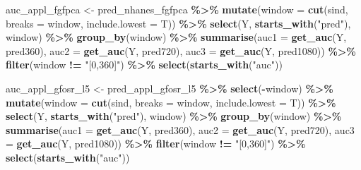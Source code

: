 \documentclass[
]{article}
\newenvironment{Shaded}{\begin{snugshade}}{\end{snugshade}}
\newcommand{\AttributeTok}[1]{\textcolor[rgb]{0.13,0.29,0.53}{#1}}
\newcommand{\FunctionTok}[1]{\textcolor[rgb]{0.13,0.29,0.53}{\textbf{#1}}}
\newcommand{\NormalTok}[1]{#1}
\newcommand{\OtherTok}[1]{\textcolor[rgb]{0.56,0.35,0.01}{#1}}
\newcommand{\SpecialCharTok}[1]{\textcolor[rgb]{0.81,0.36,0.00}{\textbf{#1}}}
\newcommand{\StringTok}[1]{\textcolor[rgb]{0.31,0.60,0.02}{#1}}
\begin{document}
\begin{Shaded}
\begin{Highlighting}[]
\NormalTok{auc\_appl\_fgfpca }\OtherTok{\textless{}{-}}\NormalTok{ pred\_nhanes\_fgfpca }\SpecialCharTok{\%\textgreater{}\%} 
    \FunctionTok{mutate}\NormalTok{(}\AttributeTok{window =} \FunctionTok{cut}\NormalTok{(sind, }\AttributeTok{breaks =}\NormalTok{ window, }\AttributeTok{include.lowest =}\NormalTok{ T)) }\SpecialCharTok{\%\textgreater{}\%} 
    \FunctionTok{select}\NormalTok{(Y, }\FunctionTok{starts\_with}\NormalTok{(}\StringTok{"pred"}\NormalTok{), window) }\SpecialCharTok{\%\textgreater{}\%}
    \FunctionTok{group\_by}\NormalTok{(window) }\SpecialCharTok{\%\textgreater{}\%}
    \FunctionTok{summarise}\NormalTok{(}\AttributeTok{auc1 =} \FunctionTok{get\_auc}\NormalTok{(Y, pred360),}
              \AttributeTok{auc2 =} \FunctionTok{get\_auc}\NormalTok{(Y, pred720),}
              \AttributeTok{auc3 =} \FunctionTok{get\_auc}\NormalTok{(Y, pred1080)) }\SpecialCharTok{\%\textgreater{}\%}
    \FunctionTok{filter}\NormalTok{(window }\SpecialCharTok{!=} \StringTok{"[0,360]"}\NormalTok{) }\SpecialCharTok{\%\textgreater{}\%} 
    \FunctionTok{select}\NormalTok{(}\FunctionTok{starts\_with}\NormalTok{(}\StringTok{"auc"}\NormalTok{))}

\NormalTok{auc\_appl\_gfosr\_l5 }\OtherTok{\textless{}{-}}\NormalTok{ pred\_appl\_gfosr\_l5 }\SpecialCharTok{\%\textgreater{}\%} 
  \FunctionTok{select}\NormalTok{(}\SpecialCharTok{{-}}\NormalTok{window) }\SpecialCharTok{\%\textgreater{}\%}
    \FunctionTok{mutate}\NormalTok{(}\AttributeTok{window =} \FunctionTok{cut}\NormalTok{(sind, }\AttributeTok{breaks =}\NormalTok{ window, }\AttributeTok{include.lowest =}\NormalTok{ T)) }\SpecialCharTok{\%\textgreater{}\%} 
    \FunctionTok{select}\NormalTok{(Y, }\FunctionTok{starts\_with}\NormalTok{(}\StringTok{"pred"}\NormalTok{), window) }\SpecialCharTok{\%\textgreater{}\%}
    \FunctionTok{group\_by}\NormalTok{(window) }\SpecialCharTok{\%\textgreater{}\%}
    \FunctionTok{summarise}\NormalTok{(}\AttributeTok{auc1 =} \FunctionTok{get\_auc}\NormalTok{(Y, pred360),}
              \AttributeTok{auc2 =} \FunctionTok{get\_auc}\NormalTok{(Y, pred720),}
              \AttributeTok{auc3 =} \FunctionTok{get\_auc}\NormalTok{(Y, pred1080)) }\SpecialCharTok{\%\textgreater{}\%}
    \FunctionTok{filter}\NormalTok{(window }\SpecialCharTok{!=} \StringTok{"[0,360]"}\NormalTok{) }\SpecialCharTok{\%\textgreater{}\%} 
    \FunctionTok{select}\NormalTok{(}\FunctionTok{starts\_with}\NormalTok{(}\StringTok{"auc"}\NormalTok{))}


\end{Highlighting}
\end{Shaded}
\end{document}
